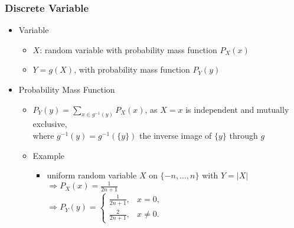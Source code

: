 \subsubsection{Discrete Variable}
\begin{itemize}
\item Variable
	\begin{itemize}
	\item $X$: random variable with probability mass function $P_X(x)$
	\item $Y = g(X)$, with probability mass function $P_Y(y)$
	\end{itemize}
\item Probability Mass Function
	\begin{itemize}
	\item $\displaystyle P_Y(y) = \sum_{x\in g^{-1}(y)} P_X(x)$, as $X=x$ is independent and mutually exclusive, \\
	where $g^{-1}(y)=g^{-1}(\{y\})$ the inverse image of $\{y\}$ through $g$
	\item Example
		\begin{itemize}
		\item uniform random variable $X$ on $\{-n,...,n\}$ with $Y=|X|$ \\
		$\Rightarrow P_X(x) = \frac 1 {2n+1}$ \\
		$\Rightarrow P_Y(y) = \begin{cases} \frac 1 {2n+1}, &x=0, \\ \frac 2 {2n+1}, &x\neq0. \end{cases}$
		\end{itemize}
	\end{itemize}
\end{itemize}

